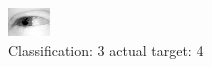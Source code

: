 \begin{figure}[h!]
\begin{center}
\includegraphics[width=0.60\columnwidth]{figures/ID2441_class_3_target_4.png}
\end{center}
\caption{ Classification: 3 actual target: 4}
\label{fig:ID2441_class_3_target_4}
\end{figure}
